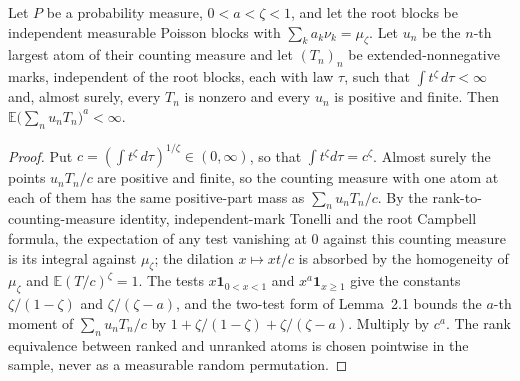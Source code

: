 \begin{lemma}\label{lem:sg:cascade-marked}
  \leanok
Let $P$ be a probability measure, $0<a<\zeta<1$, and let the root blocks be
independent measurable Poisson blocks with $\sum_k a_k\nu_k=\mu_\zeta$. Let $u_n$ be
the $n$-th largest atom of their counting measure and let $(T_n)_n$ be
extended-nonnegative marks, independent of the root blocks, each with law $\tau$,
such that $\int t^\zeta\,d\tau<\infty$ and, almost surely, every $T_n$ is nonzero and
every $u_n$ is positive and finite. Then
$\mathbb E\big(\sum_n u_nT_n\big)^a<\infty$.
\end{lemma}
\begin{proof}
  \leanok
Put $c=(\int t^\zeta\,d\tau)^{1/\zeta}\in(0,\infty)$, so that $\int t^\zeta d\tau=c^\zeta$.
Almost surely the points $u_nT_n/c$ are positive and finite, so the
counting measure with one atom at each of them has the same positive-part mass
as $\sum_n u_nT_n/c$. By the rank-to-counting-measure identity, independent-mark Tonelli
and the root Campbell formula, the expectation of any test vanishing at $0$ against this
counting measure is its integral against $\mu_\zeta$; the dilation $x\mapsto xt/c$ is
absorbed by the homogeneity of $\mu_\zeta$ and $\mathbb E(T/c)^\zeta=1$. The tests
$x\mathbf 1_{0<x<1}$ and $x^a\mathbf 1_{x\ge1}$ give the constants $\zeta/(1-\zeta)$
and $\zeta/(\zeta-a)$, and the two-test form of Lemma~2.1 bounds the
$a$-th moment of $\sum_nu_nT_n/c$ by $1+\zeta/(1-\zeta)+\zeta/(\zeta-a)$.
Multiply by $c^a$. The rank equivalence between ranked and unranked atoms is chosen
pointwise in the sample, never as a measurable random permutation.
\end{proof}

